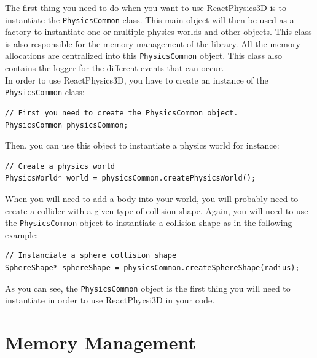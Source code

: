 \documentclass[a4paper,12pt]{article}
\begin{document}
   The first thing you need to do when you want to use ReactPhysics3D is to instantiate the \texttt{PhysicsCommon} class.
   This main object will then be used as a factory to instantiate one or multiple physics worlds and other objects. This class is also
   responsible for the memory management of the library. All the memory allocations are centralized into this \texttt{PhysicsCommon} object.
   This class also contains the logger for the different events that can occur. \\

   In order to use ReactPhysics3D, you have to create an instance of the \texttt{PhysicsCommon} class: \\

   \begin{lstlisting}
// First you need to create the PhysicsCommon object. 
PhysicsCommon physicsCommon;
   \end{lstlisting}

    \vspace{0.6cm}

   Then, you can use this object to instantiate a physics world for instance: \\

   \begin{lstlisting}
// Create a physics world
PhysicsWorld* world = physicsCommon.createPhysicsWorld();
   \end{lstlisting}

    \vspace{0.6cm}

   When you will need to add a body into your world, you will probably need to create a collider with a given type of collision shape. 
   Again, you will need to use the \texttt{PhysicsCommon} object to instantiate a collision shape as in the following example: \\

   \begin{lstlisting}
// Instanciate a sphere collision shape
SphereShape* sphereShape = physicsCommon.createSphereShape(radius);
   \end{lstlisting}

   \vspace{0.6cm}

   As you can see, the \texttt{PhysicsCommon} object is the first thing you will need to instantiate in order to use ReactPhycsi3D in your code.

   \section{Memory Management}
\end{document}
